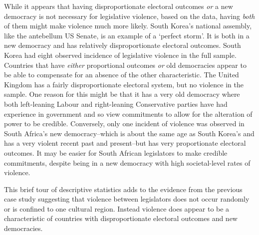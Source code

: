 \documentclass[a4paper]{article}\usepackage[]{graphicx}\usepackage[]{color}
\begin{document}
While it appears that having disproportionate electoral outcomes \emph{or} a new democracy is not necessary for legislative violence, based on the data, having \emph{both} of them might make violence much more likely. South Korea's national assembly, like the antebellum US Senate, is an example of a `perfect storm'. It is both in a new democracy and has relatively disproportionate electoral outcomes. South Korea had eight observed incidence of legislative violence in the full sample. Countries that have \emph{either} proportional outcomes \emph{or} old democracies appear to be able to compensate for an absence of the other characteristic. The United Kingdom has a fairly disproportionate electoral system, but no violence in the sample. One reason for this might be that it has a very old democracy where both left-leaning Labour and right-leaning Conservative parties have had experience in government and so view commitments to allow for the alteration of power to be credible.  Conversely, only one incident of violence was observed in South Africa's new democracy--which is about the same age as South Korea's and has a very violent recent past and present--but has very proportionate electoral outcomes. It may be easier for South African legislators to make credible commitments, despite being in a new democracy with high societal-level rates of violence.

This brief tour of descriptive statistics adds to the evidence from the previous case study suggesting that violence between legislators does not occur randomly or is confined to one cultural region. Instead violence does appear to be a characteristic of countries with disproportionate electoral outcomes and new democracies.
\end{document}
